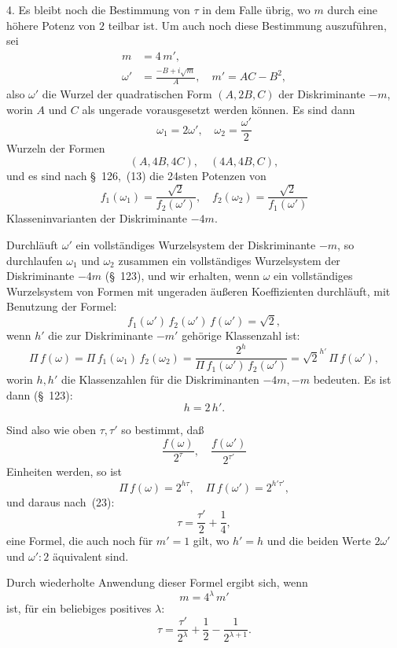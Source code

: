 \documentclass[12pt,a4paper]{article}
\theoremstyle{definition}
\begin{document}
4. Es bleibt noch die Bestimmung von $\tau$ in dem Falle übrig, wo $m$ 
durch eine höhere Potenz von $2$ teilbar ist. Um auch noch diese 
Bestimmung auszuführen, sei
\begin{align}
m &= 4\,m',\\
\omega' &= \frac{-B + i\sqrt{m}}{A},\quad m' = AC - B^{2},
\end{align}
also $\omega'$ die Wurzel der quadratischen Form $(A, 2B, C)$ der 
Diskriminante $-m$, worin $A$ und $C$ als ungerade vorausgesetzt werden 
können. Es sind dann
\begin{equation}
\omega_{1} = 2\omega',\quad \omega_{2} = \frac{\omega'}{2}
\end{equation}
Wurzeln der Formen
\begin{equation}
(A, 4B, 4C),\quad (4A, 4B, C),
\end{equation}
und es sind nach \S~126,~(13) die 24sten Potenzen von
\[
f_{1}(\omega_{1}) = \frac{\sqrt{2}}{f_{2}(\omega')},\quad
f_{2}(\omega_{2}) = \frac{\sqrt{2}}{f_{1}(\omega')}
\]
Klasseninvarianten der Diskriminante $-4m$.

Durchläuft $\omega'$ ein vollständiges Wurzelsystem der Diskriminante 
$-m$, so durchlaufen $\omega_{1}$ und $\omega_{2}$ zusammen ein vollständiges 
Wurzelsystem der Diskriminante $-4m$ (\S~123), und wir erhalten, wenn 
$\omega$ ein vollständiges Wurzelsystem von Formen mit ungeraden äußeren 
Koeffizienten durchläuft, mit Benutzung der Formel:
\[
f_{1}(\omega')\,f_{2}(\omega')\,f(\omega') = \sqrt{2},
\]
wenn $h'$ die zur Diskriminante $-m'$ gehörige Klassenzahl ist:
\begin{equation}
\varPi\,f(\omega) = \varPi\,f_{1}(\omega_{1})\,f_{2}(\omega_{2})
= \frac{2^{h}}{\varPi\,f_{1}(\omega')\,f_{2}(\omega')}
= \sqrt{2}^{h'}\,\varPi\,f(\omega'),
\end{equation}
worin $h, h'$ die Klassenzahlen für die Diskriminanten $-4m, -m$ 
bedeuten. Es ist dann (\S~123):
\[
h = 2\,h'.
\]

Sind also wie oben $\tau, \tau'$ so bestimmt, daß
\[
\frac{f(\omega)}{2^{\tau}},\quad \frac{f(\omega')}{2^{\tau'}}
\]
Einheiten werden, so ist
\[
\varPi\,f(\omega) = 2^{h\tau},\quad \varPi\,f(\omega') = 2^{h'\tau'},
\]
und daraus nach~(23):
\begin{equation}
\tau = \frac{\tau'}{2} + \frac{1}{4},
\end{equation}
eine Formel, die auch noch für $m' = 1$ gilt, wo $h' = h$ und die beiden 
Werte $2\omega'$ und $\omega':2$ äquivalent sind.

Durch wiederholte Anwendung dieser Formel ergibt sich, wenn
\[
m = 4^{\lambda}\,m'
\]
ist, für ein beliebiges positives $\lambda$:
\[
\tau = \frac{\tau'}{2^{\lambda}} + \frac{1}{2} - \frac{1}{2^{\lambda+1}}.
\]
\end{document}
